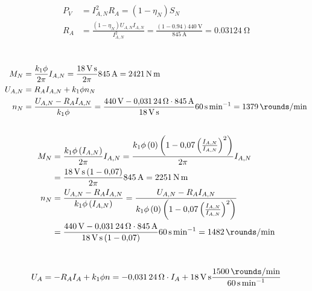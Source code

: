 \documentclass[11pt,a4paper]{scrartcl}
\newcommand{\mybr}[1]{\left(#1\right)}
\newcommand{\0}{_{\mybr{0}}}
\newcommand{\1}{_{\mybr{1}}}
\newcommand{\2}{_{\mybr{2}}}
\begin{document}
\section{}
\begin{align}
P_V&=I_{A,N}^2 R_A=\mybr{1-\eta_N}S_N\\
R_A&=\frac{\mybr{1-\eta_N}U_{A,N} I_{A,N}}{I_{A,N}^2}=\frac{\mybr{1-\num{0.94}}\SI{440}{\volt}}{\SI{845}{\ampere}}=\SI{0.03124}{\ohm}
\end{align}

\section{}
\subsection{}
\begin{align}
M_N&=\frac{k_1\phi}{2\pi}I_{A,N}=\frac{\SI{18}{\volt\second}}{2\pi}\SI{845}{\ampere}=\SI{2421}{\newton\metre}\\
U_{A,N}&=R_A I_{A,N} + k_1\phi n_N\\
n_N&=\frac{U_{A,N}-R_A I_{A,N}}{k_1\phi}=\frac{\SI{440}{\volt}-\SI{0.03124}{\ohm}\cdot\SI{845}{\ampere}}{\SI{18}{\volt\second}}\SI{60}{\second\per\minute}=\SI{1379}{\rounds\per\minute}
\end{align}
\subsection{}
\begin{align}
M_N&=\frac{k_1\phi\mybr{I_{A,N}}}{2\pi}I_{A,N}=\frac{k_1\phi\mybr{0}\mybr{1-\num{0.07}\mybr{\frac{I_{A,N}}{I_{A,N}}}^2}}{2\pi}I_{A,N}\\
&=\frac{\SI{18}{\volt\second}\mybr{1-\num{0.07}}}{2\pi}\SI{845}{\ampere}=\SI{2251}{\newton\metre}\\
n_N&=\frac{U_{A,N}-R_A I_{A,N}}{k_1\phi\mybr{I_{A,N}}}=\frac{U_{A,N}-R_A I_{A,N}}{k_1\phi\mybr{0}\mybr{1-\num{0.07}\mybr{\frac{I_{A,N}}{I_{A,N}}}^2}}\\
&=\frac{\SI{440}{\volt}-\SI{0.03124}{\ohm}\cdot\SI{845}{\ampere}}{\SI{18}{\volt\second}\mybr{1-\num{0.07}}}\SI{60}{\second\per\minute}=\SI{1482}{\rounds\per\minute}
\end{align}

\section{}
\subsection{}
\begin{equation}
U_A=-R_A I_A + k_1\phi n=-\SI{0.03124}{\ohm}\cdot I_A+\SI{18}{\volt\second}\frac{\SI{1500}{\rounds\per\minute}}{\SI{60}{\second\per\minute}}
\end{equation}
\end{document}
